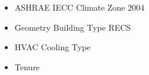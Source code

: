 \begin{itemize}
\item ASHRAE IECC Climate Zone 2004
\item Geometry Building Type RECS
\item HVAC Cooling Type
\item Tenure
\end{itemize}
